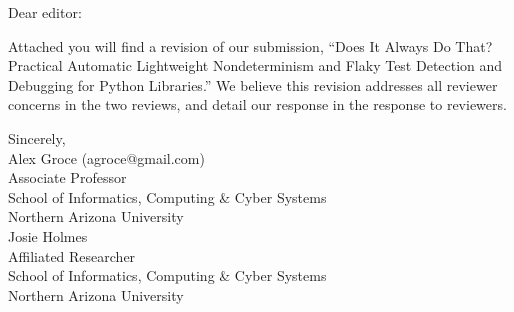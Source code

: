 \documentclass{letter}
\begin{document}
\begin{letter}{}

  \address{Alex Groce\\School of Informatics, Computing \& Cyber Systems\\Northern Arizona University}

  \opening{Dear editor:}

  Attached you will find a revision of our submission, ``Does It Always Do That?  Practical Automatic Lightweight Nondeterminism
  and Flaky Test
  Detection and Debugging for Python Libraries.''  We believe this
  revision addresses all reviewer concerns in the two reviews, and
  detail our response in the response to reviewers.

  \closing{Sincerely,\\Alex Groce (agroce@gmail.com)\\Associate
    Professor\\
    School of Informatics, Computing \& Cyber Systems\\Northern
    Arizona University \vspace{0.1in}\\Josie Holmes\\Affiliated Researcher\\
    School of Informatics, Computing \& Cyber Systems\\Northern Arizona University}

\end{letter}
\end{document}
